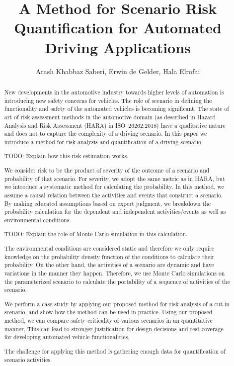 \documentclass[letterpaper, 10 pt, conference]{ieeeconf}  %
\title{\LARGE \bf
A Method for Scenario Risk Quantification for Automated Driving Applications
}
\author{Arash Khabbaz Saberi, Erwin de Gelder, Hala Elrofai}
\begin{document}
\maketitle
\thispagestyle{empty}
\pagestyle{empty}


\begin{abstract}
New developments in the automotive industry towards higher levels of automation is introducing new safety concerns for vehicles. 
The role of scenario in defining the functionality and safety of the automated vehicles is becoming significant. 
The state of art of risk assessment methods in the automotive domain (as described in Hazard Analysis and Risk Assessment (HARA) in ISO~26262:2018) have a qualitative nature and does not to capture the complexity of a driving scenario. 	
In this paper we introduce a method for risk analysis and quantification of a driving scenario.

\color{red}
TODO: Explain how this risk estimation works. 

We consider risk to be the product of severity of the outcome of a scenario and probability of that scenario.
For severity, we adopt the same metric as in HARA, but we introduce a systematic method for calculating the probability. 
In this method, we assume a causal relation between the activities and events that construct a scenario. 
By making educated assumptions based on expert judgment, we breakdown the probability calculation for the dependent and independent activities/events as well as environmental conditions. 

TODO: Explain the role of Monte Carlo simulation in this calculation. 

The environmental conditions are considered static and therefore we only require knowledge on the probability density function of the conditions to calculate their probability. 
On the other hand, the activities of a scenario are dynamic and have variations in the manner they happen. 
Therefore, we use Monte Carlo simulations on the parameterized scenario to calculate the portability of a sequence of activities of the scenario.  
\color{black}

We perform a case study by applying our proposed method for risk analysis of a cut-in scenario, and show how the method can be used in practice. 
Using our proposed method, we can compare safety criticality of various scenarios in an quantitative manner. 
This can lead to stronger justification for design decisions and test coverage for developing automated vehicle functionalities. 

\color{red}
The challenge for applying this method is gathering enough data for quantification of scenario activities.
\color{black}
\end{abstract}
\end{document}
